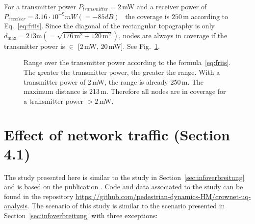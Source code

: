 For a transmitter power $P_{transmitter}=2\,$mW and a receiver power of $P_{receiver}=3.16 \cdot 10^{-9}mW (=-85dB)$~\cite{burbank-2011-com} the coverage is $250\,$m according to Eq.~\eqref{eq:friis}. Since the diagonal of the rectangular topography is only $d_\text{max}=213\text{m} (=\sqrt{176\,\text{m}^2+120\,\text{m}^2})$, nodes are always in coverage if the transmitter power is $\in$ [2\,mW, 20\,mW]. See Fig.~\ref{fig:pathlossfriis}.


\begin{figure}[H]
\caption[Damping over distance for mobile connections]{Range over the transmitter power according to the formula~\eqref{eq:friis}. The greater the transmitter power, the greater the range. With a transmitter power of 2\,mW, the range is already 250\,m. The maximum distance is 213\,m. Therefore all nodes are in coverage for a transmitter power $>2$\,mW. }
\label{fig:pathlossfriis}
\end{figure}

\chapter{Effect of network traffic (Section 4.1)}
\label{sec:effectofnetworktraffic}
The study presented here is similar to the study in Section~\ref{sec:infoverbreitung} and is based on the publication \cite{mayr-2021-com}. Code and data associated to the study can be found in the repository \url{https://github.com/pedestrian-dynamics-HM/crownet-uq-analysis}.
The scenario of this study is similar to the scenario presented in Section~\ref{sec:infoverbreitung} with three exceptions:

